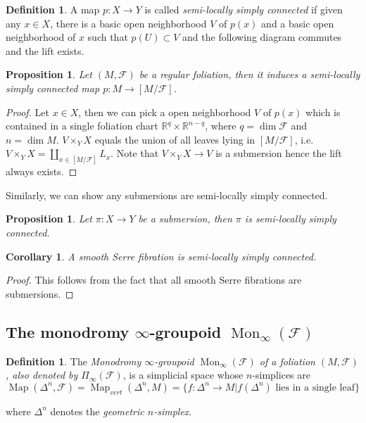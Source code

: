 \documentclass[12pt]{amsart}
\newtheorem{cor}[thm]{Corollary}
\newtheorem{prop}[thm]{Proposition}
\theoremstyle{definition}
\newtheorem{defn}[thm]{Definition}
\theoremstyle{remark}
\numberwithin{equation}{section}
\newcommand{\del}{\partial}
\renewcommand{\del}{\partial}
\newcommand{\CF}{{\mathcal F}}
\newcommand{\R}{{\mathbb{R}}}
\newcommand{\1}{{\mathbb{1}}}
\newcommand{\map}{\operatorname{Map}}
\newcommand{\mon}{\operatorname{Mon}}
\begin{document}
\begin{defn}
	A map $p: X \to Y$ is called {\it semi-locally simply connected} if given any $x\in X$, there is a basic open neighborhood $V$ of $p(x)$ and a basic open neighborhood of $x$ such that $p(U) \subset V$ and the following diagram commutes and the lift exists.
	\begin{center}
	\end{center}
\end{defn} 

\begin{prop}
	Let $(M, \CF)$ be a regular foliation, then it induces a semi-locally simply connected map $p: M \to [M/\CF]$.
\end{prop}
\begin{proof}
	Let $x\in X$, then we can pick a open neighborhood $V$ of $p(x)$ which is contained in a single foliation chart $\R^q \times \R^{n-q}$, where $q=\dim \CF$ and $n = \dim M$.  $V\times_Y X$ equals the union of all leaves lying in $[M/\mathcal{F}]$, i.e. $V\times_Y X = \coprod_{x\in [M/\mathcal{F}]} L_x$. Note that $V\times_Y X \to V$ is a submersion hence the lift always exists. 
	\end{proof}
Similarly, we can show any submersions are semi-locally simply connected.
\begin{prop}
	Let $\pi: X\to Y$ be a submersion, then $\pi$ is semi-locally simply connected.
\end{prop}

\begin{cor}
	A smooth Serre fibration is semi-locally simply connected.
\end{cor}
\begin{proof}
	This follows from the fact that all smooth Serre fibrations are submersions.
	\end{proof}





\subsection{The monodromy $\infty$-groupoid $\mon_{\infty}(\CF)$}
\begin{defn}
	The {\it Monodromy  $\infty$-groupoid $\mon_{\infty}(\CF)$ of a foliation $(M, \CF)$, also denoted by $\Pi_{\infty} (\CF)$}, is a simplicial space whose $n$-simplices are $$\map(\Delta^n, \mathcal{F})= \map_{vert}(\Delta^n, M) = \{f: \Delta^n \to M| f(\Delta^n) \text{ lies in a single leaf} \}$$
	
	where $\Delta^n$ denotes the {\it geometric $n$-simplex}.
\end{defn}
\end{document}
